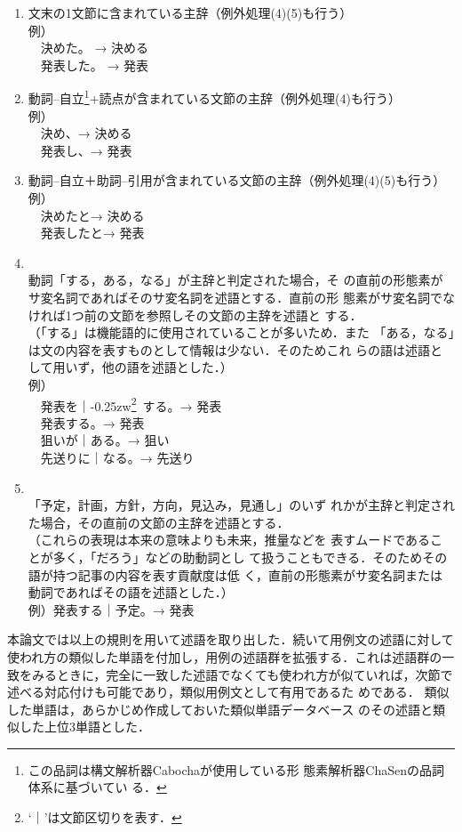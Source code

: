 \documentclass[japanese]{jnlp_1.4}
\def\toolref#1{}
\begin{document}
\begin{enumerate}
\item 文末の1文節に含まれている主辞（例外処理(4)(5)も行う）\\
	例）\\
	　決めた。   →  決める\\
	　発表した。 →  発表
\item 動詞--自立\footnote{この品詞は構文解析器Cabochaが使用している形
       態素解析器ChaSen\toolref{ツール:chasen}の品詞体系に基づいてい
       る．}+読点が含まれている文節の主辞（例外処理(4)も行う）\\
	例）\\
	　決め、→ 決める\\
	　発表し、→ 発表
\item 動詞--自立＋助詞--引用が含まれている文節の主辞（例外処理(4)(5)も行う）\\
	例）\\
	　決めたと→ 決める\\
	　発表したと→ 発表
\item {}\\ 
	動詞「する，ある，なる」が主辞と判定された場合，そ
       の直前の形態素がサ変名詞であればそのサ変名詞を述語とする．直前の形
       態素がサ変名詞でなければ1つ前の文節を参照しその文節の主辞を述語と
       する．\\
	（「する」は機能語的に使用されていることが多いため．また
       「ある，なる」は文の内容を表すものとして情報は少ない．そのためこれ
       らの語は述語として用いず，他の語を述語とした．）\\
	例）\\
	　発表を｜\kern-0.25zw\footnote{`｜'は文節区切りを表す．}\ する。→ 発表\\
	　発表する。→ 発表\\
	　狙いが｜ある。→ 狙い\\
	　先送りに｜なる。→ 先送り
\item {} \\
	「予定，計画，方針，方向，見込み，見通し」のいず
       れかが主辞と判定された場合，その直前の文節の主辞を述語とする．\\
	（これらの表現は本来の意味よりも未来，推量などを
       表すムード\cite{寺村}であることが多く，「だろう」などの助動詞とし
       て扱うこともできる．そのためその語が持つ記事の内容を表す貢献度は低
       く，直前の形態素がサ変名詞または動詞であればその語を述語とした．）\\
	例）発表する｜予定。→ 発表
\end{enumerate}
本論文では以上の規則を用いて述語を取り出した．続いて用例文の述語に対して
使われ方の類似した単語を付加し，用例の述語群を拡張する．これは述語群の一
致をみるときに，完全に一致した述語でなくても使われ方が似ていれば，次節で
述べる対応付けも可能であり，類似用例文として有用であるた
めである． 類似した単語は，あらかじめ作成しておいた類似単語データベース
のその述語と類似した上位3単語とした．
\end{document}
